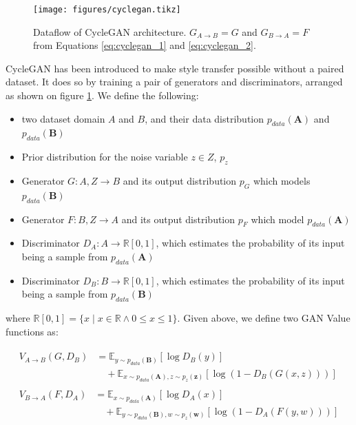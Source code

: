 \documentclass[12pt,a4paper,]{report}
\providecommand{\tightlist}{%
  \setlength{\itemsep}{0pt}\setlength{\parskip}{0pt}}
\begin{document}
\begin{figure}[h]
    \texttt{[image: figures/cyclegan.tikz]}
    \centering
    \caption[Dataflow of CycleGAN architecture]{Dataflow of CycleGAN architecture. $G_{A \rightarrow B} = G$ and $G_{B \rightarrow A} = F$ from Equations \ref{eq:cyclegan_1} and \ref{eq:cyclegan_2}. \label{fig:cyclegan}}
\end{figure}

CycleGAN has been introduced to make style transfer possible without a
paired dataset. It does so by training a pair of generators and
discriminators, arranged as shown on figure \ref{fig:cyclegan}. We
define the following:

\begin{itemize}
\tightlist
\item
  two dataset domain \(A\) and \(B\), and their data distribution
  \(p_{data}(\mathbf{A})\) and \(p_{data}(\mathbf{B})\)
\item
  Prior distribution for the noise variable \(z \in Z\), \(p_z\)
\item
  Generator \(G: A, Z \rightarrow B\) and its output distribution
  \(p_G\) which models \(p_{data}(\mathbf{B})\)
\item
  Generator \(F: B, Z \rightarrow A\) and its output distribution
  \(p_F\) which model \(p_{data}(\mathbf{A})\)
\item
  Discriminator \(D_{A}: A \rightarrow \mathbb{R}[0, 1]\), which
  estimates the probability of its input being a sample from
  \(p_{data}(\mathbf{A})\)
\item
  Discriminator \(D_{B}: B \rightarrow \mathbb{R}[0, 1]\), which
  estimates the probability of its input being a sample from
  \(p_{data}(\mathbf{B})\)
\end{itemize}

where
\(\mathbb{R}[0, 1] = \{x \mid x \in \mathbb{R} \land 0 \leq x \leq 1 \}\).
Given above, we define two GAN Value functions as:

\begin{align}
    \begin{split}
        V_{A \rightarrow B}(G, D_B) &= \mathbb{E}_{y \sim p_{data}(\mathbf{B})}[ \log D_B(y)]  \\
        &\quad + \mathbb{E}_{x \sim p_{data}(\mathbf{A}), z \sim p_{z}(\mathbf{z})} [\log (1 - D_B(G(x, z)))] \label{eq:cyclegan_1}
    \end{split} \\
    \begin{split}
        V_{B \rightarrow A}(F, D_A) &= \mathbb{E}_{x \sim p_{data}(\mathbf{A})}[ \log D_A(x)]  \\
        &\quad + \mathbb{E}_{y \sim p_{data}(\mathbf{B}), w \sim p_{z}(\mathbf{w})} [\log (1 - D_A(F(y, w)))] \label{eq:cyclegan_2}
    \end{split} 
\end{align}
\end{document}
